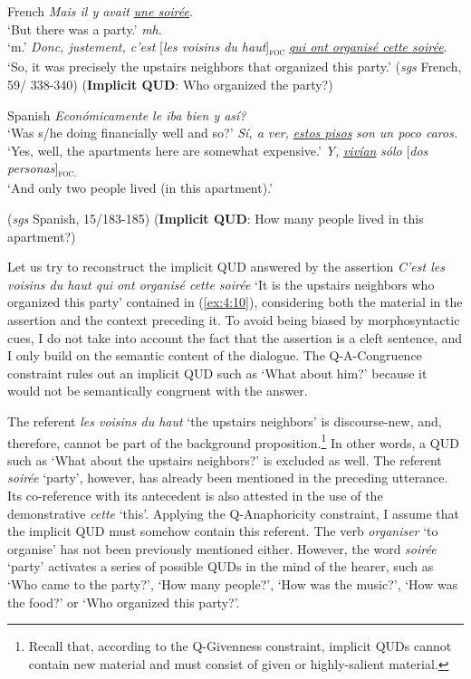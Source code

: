 \ea \label{ex:4:10} French
\ea \textit{Mais il y avait} \uline{\textit{une soirée}}.\\
`But there was a party.'
\ex \textit{mh}.\\
`m.'
 \textit{Donc, justement, c'est} {[\textit{les voisins du haut}]\textsubscript{\textsc{foc}}} \normalsize \uline{\textit{qui ont organisé cette soirée}}.\\
`So, it was precisely the upstairs neighbors that organized this party.' \hfill (\textit{sgs} French, 59/ 338-340)    
\z \z 
\hfill (\textbf{Implicit QUD}: Who organized the party?)

\ea \label{ex:4:11} Spanish
\ea \textit{Económicamente le iba bien y así?}\\  
`Was s/he doing financially well and so?'
\ex \textit{Sí, a ver,} \uline{\textit{estos pisos}} \textit{son un poco caros.}\\
`Yes, well, the apartments here are somewhat expensive.'
 \textit{Y,} \uline{\textit{vivían}} \textit{sólo} {[\textit{dos personas}]\textsubscript{\textsc{foc.}}}\normalsize\\
`And only two people lived (in this apartment).' 

\hfill (\textit{sgs} Spanish, 15/183-185)
\z \z
\hfill (\textbf{Implicit QUD}: How many people lived in this apartment?)\medskip


Let us try to reconstruct the implicit QUD answered by the assertion \textit{C'est les voisins du haut qui ont organisé cette soirée} `It is the upstairs neighbors who organized this party' contained in (\ref{ex:4:10}), considering both the material in the assertion and the context preceding it. To avoid being biased by morphosyntactic cues, I do not take into account  the fact that the assertion is a cleft sentence, and I only build on the semantic content of the dialogue.
The Q-A-Congruence constraint rules out an implicit QUD such as ‘What about him?’ because it would not be semantically congruent with the answer. 

The referent \textit{les voisins du haut} `the upstairs neighbors' is discourse-new, and, therefore, cannot be part of the background proposition.\footnote{Recall that, according to the Q-Givenness constraint, implicit QUDs cannot contain new material and must consist of given or highly-salient material.} In other words, a QUD such as ‘What about the upstairs neighbors?’ is excluded as well. The referent \textit{soirée} `party', however, has already been mentioned in the preceding utterance. Its co-reference with its antecedent is also attested in the use of the demonstrative \textit{cette} `this'. 
Applying the Q-Anaphoricity constraint, I assume that the implicit QUD must somehow contain this referent. 
The verb \textit{organiser} `to organise' has not been previously mentioned either. However, the word \textit{soirée} `party' activates a series of possible QUDs in the mind of the hearer, such as `Who came to the party?', `How many people?', `How was the music?', `How was the food?' or `Who organized this party?'.

